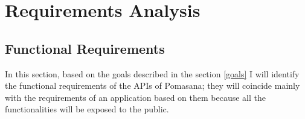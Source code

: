 


\chapter{Requirements Analysis}

	\section{Functional Requirements}
	In this section, based on the goals described in the section \ref{goals} I will identify the functional requirements of the APIs of Pomasana; they will coincide mainly with the requirements of an application based on them because all the functionalities will be exposed to the public.


